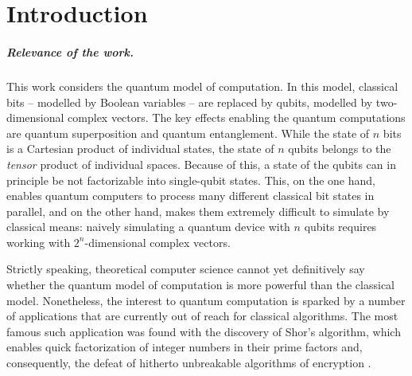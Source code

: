 

\chapter*{Introduction}


\paragraph{Relevance of the work.} 

This work considers the quantum model of computation. In this model, classical bits -- modelled by Boolean variables -- are replaced by qubits, modelled by two-dimensional complex vectors. The key effects enabling the quantum computations are quantum superposition and quantum entanglement. While the state of $n$ bits is a Cartesian product of individual states, the state of $n$ qubits belongs to the \textit{tensor} product of individual spaces. Because of this, a state of the qubits can in principle be not factorizable into single-qubit states. This, on the one hand, enables quantum computers to process many different classical bit states in parallel, and on the other hand, makes them extremely difficult to simulate by classical means: naively simulating a quantum device with $n$ qubits requires working with $2^n$-dimensional complex vectors.

Strictly speaking, theoretical computer science cannot yet definitively say whether the quantum model of computation is more powerful than the classical model. Nonetheless, the interest to quantum computation is sparked by a number of applications that are currently out of reach for classical algorithms. The most famous such application was found with the discovery of Shor's algorithm, which enables quick factorization of integer numbers in their prime factors and, consequently, the defeat of hitherto unbreakable algorithms of encryption \cite{nielsen_quantum_2010}.

